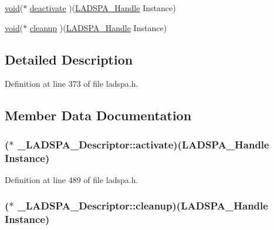 \begin{DoxyCompactItemize}
\item 
\hyperlink{sound_8c_ae35f5844602719cf66324f4de2a658b3}{void}($\ast$ \hyperlink{struct___l_a_d_s_p_a___descriptor_ae3111228cb1c3634a5c9767fadad1560}{deactivate} )(\hyperlink{src_2effects_2ladspa_2ladspa_8h_add2c8d62e2cb03e4fd16ab3f997d4195}{L\+A\+D\+S\+P\+A\+\_\+\+Handle} Instance)
\item 
\hyperlink{sound_8c_ae35f5844602719cf66324f4de2a658b3}{void}($\ast$ \hyperlink{struct___l_a_d_s_p_a___descriptor_a774f3e1cbb10f08c33592d6b7813d7c1}{cleanup} )(\hyperlink{src_2effects_2ladspa_2ladspa_8h_add2c8d62e2cb03e4fd16ab3f997d4195}{L\+A\+D\+S\+P\+A\+\_\+\+Handle} Instance)
\end{DoxyCompactItemize}


\subsection{Detailed Description}


Definition at line 373 of file ladspa.\+h.



\subsection{Member Data Documentation}
\subsubsection[{\texorpdfstring{activate}{activate}}]{($\ast$ \+\_\+\+L\+A\+D\+S\+P\+A\+\_\+\+Descriptor\+::activate)({\bf L\+A\+D\+S\+P\+A\+\_\+\+Handle} Instance)}\hypertarget{struct___l_a_d_s_p_a___descriptor_a2d4d3bc5d0d27125134345440518a89d}{}\label{struct___l_a_d_s_p_a___descriptor_a2d4d3bc5d0d27125134345440518a89d}


Definition at line 489 of file ladspa.\+h.

\subsubsection[{\texorpdfstring{cleanup}{cleanup}}]{($\ast$ \+\_\+\+L\+A\+D\+S\+P\+A\+\_\+\+Descriptor\+::cleanup)({\bf L\+A\+D\+S\+P\+A\+\_\+\+Handle} Instance)}\hypertarget{struct___l_a_d_s_p_a___descriptor_a774f3e1cbb10f08c33592d6b7813d7c1}{}\label{struct___l_a_d_s_p_a___descriptor_a774f3e1cbb10f08c33592d6b7813d7c1}


